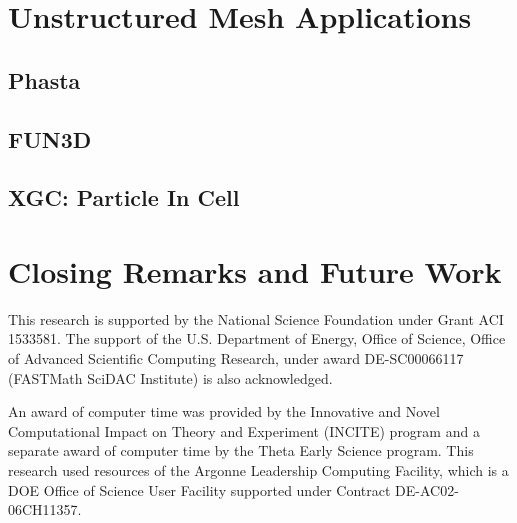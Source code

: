 
\section{Unstructured Mesh Applications}

\subsection{Phasta}

\subsection{FUN3D}

\subsection{XGC: Particle In Cell}


\section{Closing Remarks and Future Work}

\begin{acks}
This research is supported by the National Science
Foundation under Grant ACI 1533581. The support of
the U.S. Department of Energy, Office of Science,
Office of Advanced Scientific Computing Research,
under award DE-SC00066117 (FASTMath SciDAC Institute)
is also acknowledged.

An award of computer time was provided by the Innovative and Novel
Computational Impact on Theory and Experiment (INCITE) program and a separate
award of computer time by the Theta Early Science program.
This research used resources of the Argonne Leadership Computing Facility,
which is a DOE Office of Science User Facility supported under Contract
DE-AC02-06CH11357.
\end{acks}
